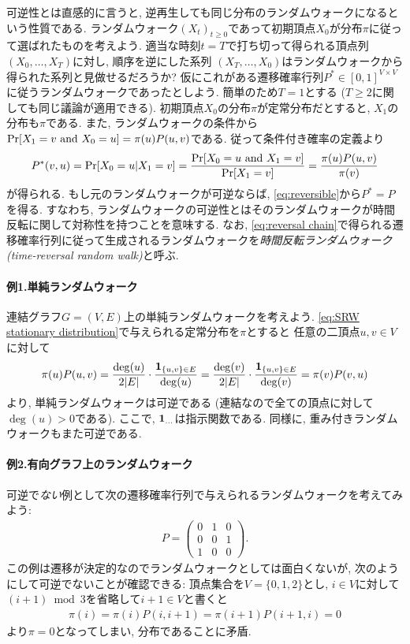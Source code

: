 可逆性とは直感的に言うと, 逆再生しても同じ分布のランダムウォークになるという性質である.
ランダムウォーク$(X_t)_{t\ge 0}$であって初期頂点$X_0$が分布$\pi$に従って選ばれたものを考えよう.
適当な時刻$t=T$で打ち切って得られる頂点列$(X_0,\dots,X_T)$に対し, 順序を逆にした系列
$(X_T,\dots,X_0)$はランダムウォークから得られた系列と見做せるだろうか?
仮にこれがある遷移確率行列$P^*\in[0,1]^{V\times V}$に従うランダムウォークであったとしよう.
簡単のため$T=1$とする ($T\ge 2$に関しても同じ議論が適用できる).
初期頂点$X_0$の分布$\pi$が定常分布だとすると, $X_1$の分布も$\pi$である.
また, ランダムウォークの条件から$\Pr[X_1 = v \text{ and } X_0=u] = \pi(u)P(u,v)$である.
従って条件付き確率の定義より
\begin{align}
    P^*(v,u) = \Pr[X_0 = u | X_1 = v] = \frac{\Pr[X_0 = u \text{ and } X_1 = v]}{\Pr[X_1 = v]} = \frac{\pi(u)P(u,v)}{\pi(v)} \label{eq:reversal chain}
\end{align}
が得られる.
もし元のランダムウォークが可逆ならば, \cref{eq:reversible}から$P^*=P$を得る.
すなわち, ランダムウォークの可逆性とはそのランダムウォークが時間反転に関して対称性を持つことを意味する.
なお, \cref{eq:reversal chain}で得られる遷移確率行列に従って生成されるランダムウォークを\emph{時間反転ランダムウォーク (time-reversal random walk)}と呼ぶ.

\paragraph*{例1.単純ランダムウォーク}
連結グラフ$G=(V,E)$上の単純ランダムウォークを考えよう.
\cref{eq:SRW stationary distribution}で与えられる定常分布を$\pi$とすると
任意の二頂点$u,v\in V$に対して
\[
    \pi(u) P(u,v) = \frac{\deg(u)}{2|E|} \cdot \frac{\mathbf{1}_{\{u,v\}\in E}}{\deg(u)}
    = \frac{\deg(v)}{2|E|} \cdot \frac{\mathbf{1}_{\{u,v\}\in E}}{\deg(v)}
    = \pi(v) P(v,u)
\]
より, 単純ランダムウォークは可逆である (連結なので全ての頂点に対して$\deg(u)>0$である).
ここで, $\mathbf{1}_{\dots}$は指示関数である.
同様に, 重み付きランダムウォークもまた可逆である.

\paragraph*{例2.有向グラフ上のランダムウォーク}
可逆で\emph{ない}例として次の遷移確率行列で与えられるランダムウォークを考えてみよう:
\begin{align*}
    P = \begin{pmatrix}
            0 & 1 & 0 \\
            0 & 0 & 1 \\
            1 & 0 & 0
        \end{pmatrix}.
\end{align*}
この例は遷移が決定的なのでランダムウォークとしては面白くないが,
次のようにして可逆でないことが確認できる:
頂点集合を$V=\{0,1,2\}$とし, $i\in V$に対して$(i+1)\bmod 3$を省略して$i+1 \in V$と書くと
\begin{align*}
    \pi(i) = \pi(i) P(i, i+1) = \pi(i+1)P(i+1,i) = 0
\end{align*}
より$\pi=0$となってしまい, 分布であることに矛盾.

